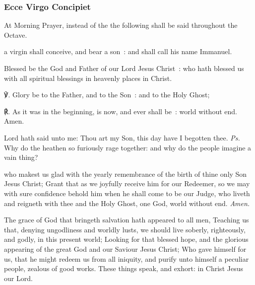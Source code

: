 \subsubsection{Ecce Virgo Concipiet}\label{eccevirgo}
\begin{rubric}
    At Morning Prayer, instead of the  the following shall be said throughout the Octave.
\end{rubric}

 a virgin shall conceive, and bear a son~: and shall call his name Immanuel.
    


Blessed be the God and Father of our Lord Jesus Christ~: who hath blessed us with all spiritual blessings in heavenly places in Christ.

℣. Glory be to the Father, and to the Son~: and to the Holy Ghost;\par
℟. As it was in the beginning, is now, and ever shall be~: world without end. Amen.


\introit
{} Lord hath said unto me: Thou art my Son, this day have I begotten thee. \textit{Ps.} Why do the heathen so furiously rage together: and why do the people imagine a vain thing?

\collect
{} who makest us glad with the yearly remembrance of the birth of thine only Son Jesus Christ; Grant that as we joyfully receive him for our Redeemer, so we may with sure confidence behold him when he shall come to be our Judge, who liveth and reigneth with thee and the Holy Ghost, one God, world without end. \textit{Amen.}

 The grace of God that bringeth salvation hath appeared to all men, Teaching us that, denying ungodliness and worldly lusts, we should live soberly, righteously, and godly, in this present world; Looking for that blessed hope, and the glorious appearing of the great God and our Saviour Jesus Christ; Who gave himself for us, that he might redeem us from all iniquity, and purify unto himself a peculiar people, zealous of good works. These things speak, and exhort: in Christ Jesus our Lord.

